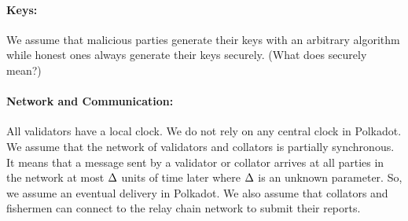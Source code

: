 \paragraph{Keys:} We assume that malicious parties generate their keys with an arbitrary algorithm 
while honest ones always generate their keys securely. (What does securely mean?)

\paragraph{Network and Communication:} All validators have a local clock. 
We do not rely on any central clock in Polkadot. 
We assume that the network of validators and collators is partially synchronous. 
It means that a message sent by a validator or collator arrives at all parties in the network 
at most $\Delta$ units of time later where $\Delta$ is an unknown parameter. So, we assume an eventual delivery in Polkadot.
We also assume that collators and fishermen can connect to the relay chain network to submit their reports.
